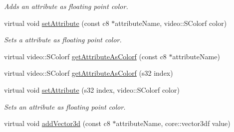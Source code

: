 \begin{DoxyCompactItemize}
\begin{DoxyCompactList}\small\item\em Adds an attribute as floating point color. \end{DoxyCompactList}\item 
\hypertarget{classirr_1_1io_1_1_c_attributes_a10b3b23ba5966c6858370c6d61e0f4e1}{virtual void \hyperlink{classirr_1_1io_1_1_c_attributes_a10b3b23ba5966c6858370c6d61e0f4e1}{set\-Attribute} (const c8 $\ast$attribute\-Name, video\-::\-S\-Colorf color)}\label{classirr_1_1io_1_1_c_attributes_a10b3b23ba5966c6858370c6d61e0f4e1}

\begin{DoxyCompactList}\small\item\em Sets a attribute as floating point color. \end{DoxyCompactList}\item 
virtual video\-::\-S\-Colorf \hyperlink{classirr_1_1io_1_1_c_attributes_aa0c5de3c6d7cb5d752617ca972aaae4f}{get\-Attribute\-As\-Colorf} (const c8 $\ast$attribute\-Name)
\item 
virtual video\-::\-S\-Colorf \hyperlink{classirr_1_1io_1_1_c_attributes_afbcc628342d7d7dbf16af6b6f47cae8b}{get\-Attribute\-As\-Colorf} (s32 index)
\item 
virtual void \hyperlink{classirr_1_1io_1_1_c_attributes_ad68b428220740dfa4814d563790feec8}{set\-Attribute} (s32 index, video\-::\-S\-Colorf color)
\begin{DoxyCompactList}\small\item\em Sets an attribute as floating point color. \end{DoxyCompactList}\item 
\hypertarget{classirr_1_1io_1_1_c_attributes_aafb30fe961719043791bbf8df1b46ead}{virtual void \hyperlink{classirr_1_1io_1_1_c_attributes_aafb30fe961719043791bbf8df1b46ead}{add\-Vector3d} (const c8 $\ast$attribute\-Name, core\-::vector3df value)}\label{classirr_1_1io_1_1_c_attributes_aafb30fe961719043791bbf8df1b46ead}


\end{DoxyCompactItemize}
